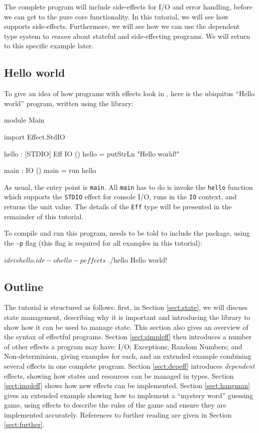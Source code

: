 The complete program will include side-effects for I/O and error handling,
before we can get to the pure core functionality. In this tutorial, we will
see how \Idris{} supports side-effects. Furthermore, we will see how we can 
use the dependent type system to \emph{reason} about stateful and
side-effecting programs. We will return to this specific example later.

\subsection{Hello world}

To give an idea of how programs with effects look in \Idris{}, here is the
ubiquitus ``Hello world'' program, written using the \effects{} library:

\begin{code}
module Main
  
import Effect.StdIO
  
hello : { [STDIO] } Eff IO ()
hello = putStrLn "Hello world!"
  
main : IO ()
main = run hello
\end{code}

\noindent
As usual, the entry point is \texttt{main}. All \texttt{main} has to do is
invoke the \texttt{hello} function which supports the \texttt{STDIO} effect
for console I/O, runs in the \texttt{IO} context, and returns the unit
value. The details of the \texttt{Eff} type will be presented in the
remainder of this tutorial.

To compile and run this program, \Idris{} needs to be told to include the
\effects{} package, using the \texttt{-p} \effects{} flag (this flag
is required for all examples in this tutorial):

\begin{code}
$ idris hello.idr -o hello -p effects
$ ./hello
Hello world!
\end{code}

\subsection{Outline}

The tutorial is structured as follows: first, in Section \ref{sect:state},
we will discuss state management, describing why it is important and introducing
the \effects{} library to show how it can be used to manage state. This section
also gives an overview of the syntax of effectful programs. Section
\ref{sect:simpleff} then introduces a number of other effects a program may
have: I/O; Exceptions; Random Numbers; and Non-determinism, giving examples
for each, and an extended example combining several effects in one complete
program. Section \ref{sect:depeff} introduces \emph{dependent} effects, showing
how states and resources can be managed in types. Section \ref{sect:impleff}
shows how new effects can be implemented. Section \ref{sect:hangman}
gives an extended example showing how to implement a ``mystery word'' guessing
game, using effects to describe the rules of the game and ensure they are
implemented accurately. References to further reading are given in
Section \ref{sect:further}.

